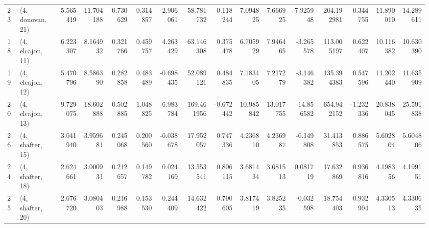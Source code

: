 \begin{tabular}{llrrrrrrrrrrrrrr}
23 &  (4, donovan, 21) &   5.565419 &  11.704188 &   0.730629 &  0.314857 &  -2.906061 &   58.781732 &  0.118244 &   7.094825 &   7.666925 &   7.925948 &   204.192981 & -0.344755 &  11.890010 &  14.289611 \\
18 &  (4, elcajon, 11) &   6.223307 &   8.164932 &   0.321766 &  0.459757 &   4.263429 &   63.146308 &  0.375478 &   6.705929 &   7.946465 &  -3.265578 &   113.005197 &  0.622407 &  10.116382 &  10.630390 \\
19 &  (4, elcajon, 12) &   5.470796 &   8.586390 &   0.282858 &  0.483489 &  -0.698435 &   52.089121 &  0.484835 &   7.183405 &   7.217279 &  -3.146382 &   135.394383 &  0.547596 &  11.202440 &  11.635909 \\
20 &  (4, elcajon, 13) &   9.729075 &  18.602888 &   0.502885 &  1.048825 &   6.983784 &  169.461956 & -0.672442 &  10.985842 &  13.017755 & -14.856582 &   654.942152 & -1.232336 &  20.838045 &  25.591838 \\
26 &  (4, shafter, 15) &   3.041940 &   3.959681 &   0.245068 &  0.200560 &  -0.038678 &   17.952057 &  0.747336 &   4.236810 &   4.236987 &  -0.149808 &    31.413853 &  0.886575 &   5.602804 &   5.604806 \\
24 &  (4, shafter, 18) &   2.624661 &   3.000931 &   0.212657 &  0.149782 &   0.024169 &   13.553541 &  0.806115 &   3.681434 &   3.681513 &   0.081719 &    17.632869 &  0.936816 &   4.198356 &   4.199151 \\
25 &  (4, shafter, 20) &   2.676720 &   3.080403 &   0.216988 &  0.153530 &   0.244409 &   14.632422 &  0.790605 &   3.817419 &   3.825235 &  -0.032598 &    18.754403 &  0.932994 &   4.330513 &   4.330635 \\
\bottomrule
\end{tabular}

